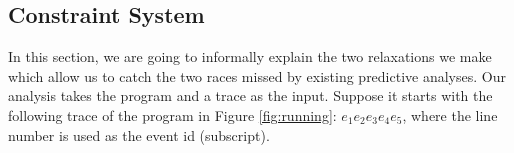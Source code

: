 


\subsection{Constraint System}
In this section, we are going to informally explain the two relaxations
we make which allow us to catch the two races missed by existing 
predictive analyses.
Our analysis takes the program and a trace as the input.  
Suppose it starts with the following trace of the program in  
Figure \ref{fig:running}:  $e_1 e_2 e_3 e_4 e_5$, where the line number 
is used as the event id (subscript). 

